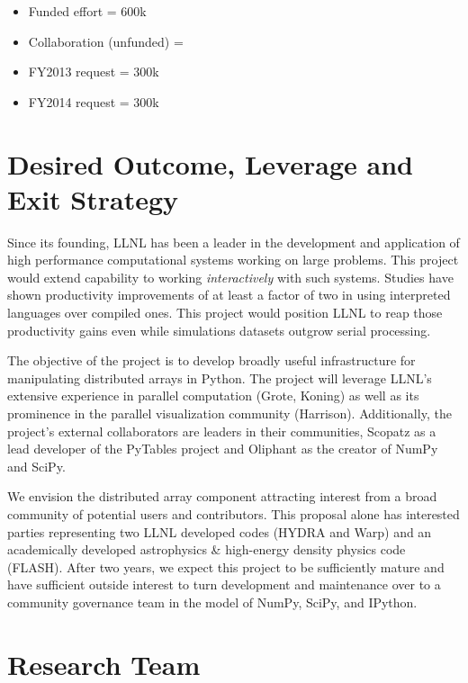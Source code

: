 \documentclass[letterpaper,12pt]{article}
\begin{document}
\begin{itemize}
	\setlength{\itemsep}{0pt}
	\setlength{\parskip}{0pt}
	\setlength{\parsep}{0pt}

	\item Funded effort = 600k
	\item Collaboration (unfunded) =
	\item FY2013 request =  300k
	\item FY2014 request =  300k
\end{itemize}


\section*{Desired Outcome, Leverage and Exit Strategy}

Since its founding, LLNL has been a leader in the development and application of high 
performance computational systems working on large problems.  This project would extend 
capability to working \emph{interactively} with such systems.  Studies have shown productivity 
improvements of at least a factor of two\cite{Prechelt2000} in using interpreted languages 
over compiled ones.  This project would position LLNL to reap those productivity gains even 
while simulations datasets outgrow serial processing.

The objective of the project is to develop broadly useful infrastructure for manipulating 
distributed arrays in Python.  The project will leverage LLNL's extensive experience in 
parallel computation (Grote, Koning) as well as its prominence in the parallel visualization 
community (Harrison).  Additionally, the project's external collaborators are leaders in their 
communities, Scopatz as a lead developer of the PyTables project and Oliphant as the creator of 
NumPy and SciPy.

We envision the distributed array component attracting interest from a broad community 
of potential users and contributors.  This proposal alone has interested parties 
representing two LLNL developed codes (HYDRA and Warp) and an academically developed 
astrophysics \& high-energy density physics code (FLASH).  After two years, we expect this 
project to be sufficiently mature and have sufficient outside interest to turn development 
and maintenance over to a community governance team in the model of NumPy, SciPy, and IPython.



\section*{Research Team}
\end{document}
